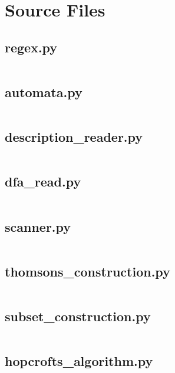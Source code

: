 \documentclass{article}
\begin{document}
\section*{Source Files}
\subsection*{regex.py}
\inputminted{python}{./regex.py}

\subsection*{automata.py}
\inputminted{python}{./automata.py}

\subsection*{description\_reader.py}
\inputminted{python}{./description_reader.py}

\subsection*{dfa\_read.py}
\inputminted{python}{./dfa_read.py}

\subsection*{scanner.py}
\inputminted{python}{./scanner.py}

\subsection*{thomsons\_construction.py}
\inputminted{python}{./thomsons_construction.py}

\subsection*{subset\_construction.py}
\inputminted{python}{./subset_construction.py}

\subsection*{hopcrofts\_algorithm.py}
\inputminted{python}{./hopcrofts_algorithm.py}
\end{document}
